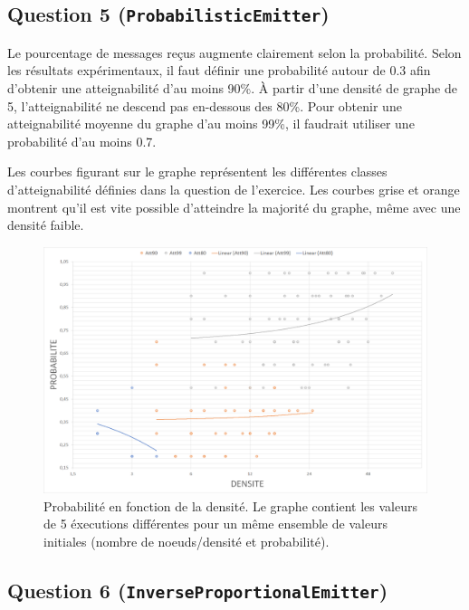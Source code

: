 \documentclass[a4paper]{article}
\begin{document}
\pagebreak

\subsection{Question 5 (\texttt{ProbabilisticEmitter})}

Le pourcentage de messages reçus augmente clairement selon la
probabilité. Selon les résultats expérimentaux, il faut définir une probabilité autour
de 0.3 afin d'obtenir une atteignabilité d'au moins 90\%. À partir
d'une densité de graphe de 5, l'atteignabilité ne descend pas
en-dessous des 80\%. Pour obtenir une atteignabilité moyenne du graphe
d'au moins 99\%, il faudrait utiliser une probabilité d'au moins 0.7.

Les courbes figurant sur le graphe représentent les différentes
classes d'atteignabilité définies dans la question de l'exercice. Les
courbes grise et orange montrent qu'il est vite possible d'atteindre la
majorité du graphe, même avec une densité faible.

\begin{figure}[H]
\begin{minipage}{\textwidth}
  \centering
    \includegraphics[width=\textwidth]{images/ex2q5-log-trendlines.png}
    \caption{Probabilité en fonction de la densité. Le graphe contient
    les valeurs de 5 éxecutions différentes pour un même ensemble de
    valeurs initiales (nombre de noeuds/densité et probabilité).}
\end{minipage}
\end{figure}

\subsection{Question 6 (\texttt{InverseProportionalEmitter})}
\end{document}
